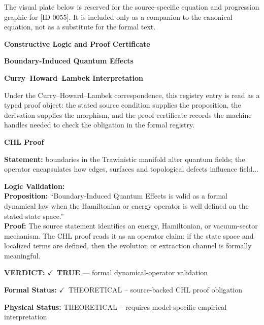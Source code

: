 \begingroup\footnotesize\sloppy
The visual plate below is reserved for the source-specific equation and progression graphic for [ID 0055]. It is included only as a companion to the canonical equation, not as a substitute for the formal text.
\par\endgroup
\ifTZPDarkEdition
{}
\fi

\clearpage
\begingroup\tzpsupportsetup
\noindent\textbf{\fontsize{10.8pt}{12.8pt}\selectfont [ID 0055] Constructive Logic and Proof Certificate}\par
\noindent\textbf{\fontsize{10pt}{12pt}\selectfont Boundary-Induced Quantum Effects}\par
\vspace{0.45em}
\begingroup
\footnotesize
\setlength{\parskip}{0.22em}
\setlength{\parindent}{0pt}
\noindent\textbf{Curry--Howard--Lambek Interpretation}\par
Under the Curry--Howard--Lambek correspondence, this registry entry is read as a typed proof
object: the stated source condition supplies the proposition, the derivation supplies the
morphism, and the proof certificate records the machine handles needed to check the obligation
in the formal registry.

\vspace{0.45em}
\noindent\textbf{CHL Proof}\par
\textbf{Statement:} boundaries in the Trawinistic manifold alter quantum fields; the operator encapsulates
how edges, surfaces and topological defects influence field...

\textbf{Logic Validation:}\\
\textbf{Proposition:} ``Boundary-Induced Quantum Effects is valid as a formal dynamical law when the Hamiltonian
or energy operator is well defined on the stated state space.''\\
\textbf{Proof:} The source statement identifies an energy, Hamiltonian, or vacuum-sector mechanism. The
CHL proof reads it as an operator claim: if the state space and localized terms are
defined, then the evolution or extraction channel is formally meaningful.

\textbf{VERDICT:} \ensuremath{\checkmark}\ \textbf{TRUE} --- formal dynamical-operator validation

\textbf{Formal Status:} \ensuremath{\checkmark}\ THEORETICAL -- source-backed CHL proof obligation

\textbf{Physical Status:} THEORETICAL -- requires model-specific empirical interpretation
\par\vspace{0.45em}
\par
\ifTZPDarkEdition
{}
\fi
\endgroup
\endgroup
